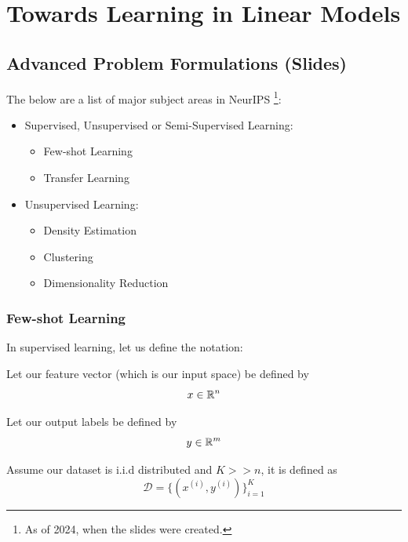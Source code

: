 \chapter{Towards Learning in Linear Models}

\section{Advanced Problem Formulations (Slides)}

The below are a list of major subject areas in NeurIPS \footnote[1][]{As of 2024, when the slides were created.}:
\begin{itemize}[noitemsep]
    \item Supervised, Unsupervised or Semi-Supervised Learning:
          \begin{itemize}[noitemsep]
              \item Few-shot Learning
              \item Transfer Learning
          \end{itemize}
    \item Unsupervised Learning:
          \begin{itemize}[noitemsep]
              \item Density Estimation
              \item Clustering
              \item Dimensionality Reduction
          \end{itemize}
\end{itemize}


\subsection{Few-shot Learning}

In supervised learning, let us define the notation:

\noindent Let our feature vector (which is our input space) be defined by
\begin{equation}
    x \in \mathbb{R}^n
\end{equation}

\noindent Let our output labels be defined by
\begin{equation}
    y \in \mathbb{R}^m
\end{equation}

\noindent  Assume our dataset is i.i.d distributed and  $K >> n$, it is defined as
\begin{equation}
    \mathcal{D} = \{(x^{(i)}, y^{(i)})\}_{i=1}^K
\end{equation}

